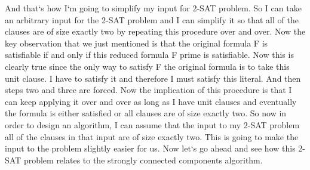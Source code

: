 And that`s how I`m going to simplify my input for 2-SAT problem.
So I can take an arbitrary input for the 2-SAT problem and I can simplify it so that all of the clauses are of size exactly two by repeating this procedure over and over.
Now the key observation that we just mentioned is that the original formula F is satisfiable if and only if this reduced formula F prime is satisfiable.
Now this is clearly true since the only way to satisfy F the original formula is to take this unit clause.
I have to satisfy it and therefore I must satisfy this literal.
And then steps two and three are forced.
Now the implication of this procedure is that I can keep applying it over and over as long as I have unit clauses and eventually the formula is either satisfied or all clauses are of size exactly two.
So now in order to design an algorithm, I can assume that the input to my 2-SAT problem all of the clauses in that input are of size exactly two.
This is going to make the input to the problem slightly easier for us.
Now let`s go ahead and see how this 2-SAT problem relates to the strongly connected components algorithm.

